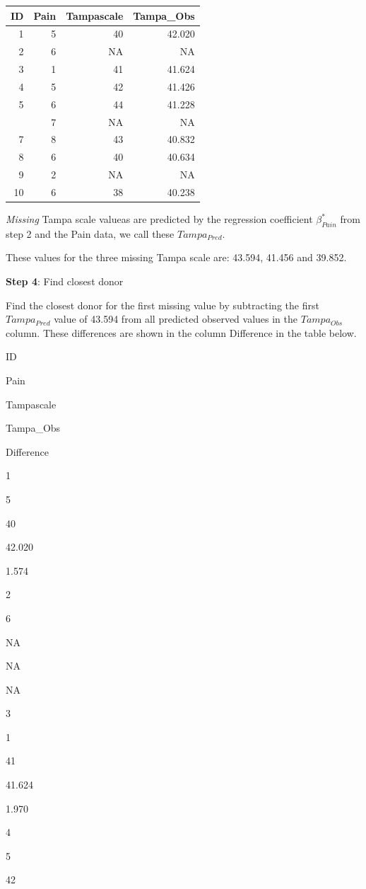 \documentclass[
]{book}
\begin{document}
\begin{tabular}{rrrr}
\toprule
ID & Pain & Tampascale & Tampa\_Obs\\
\midrule
1 & 5 & 40 & 42.020\\
2 & 6 & NA & NA\\
3 & 1 & 41 & 41.624\\
4 & 5 & 42 & 41.426\\
5 & 6 & 44 & 41.228\\
\addlinespace
6 & 7 & NA & NA\\
7 & 8 & 43 & 40.832\\
8 & 6 & 40 & 40.634\\
9 & 2 & NA & NA\\
10 & 6 & 38 & 40.238\\
\bottomrule
\end{tabular}

\emph{Missing} Tampa scale valueas are predicted by the regression
coefficient \(\beta_{Pain}^*\) from step 2 and the Pain data, we call
these \(Tampa_{Pred}\).

These values for the three missing Tampa scale are: 43.594, 41.456 and
39.852.

\textbf{Step 4}: Find closest donor

Find the closest donor for the first missing value by subtracting the
first \(Tampa_{Pred}\) value of 43.594 from all predicted observed
values in the \(Tampa_{Obs}\) column. These differences are shown in the
column Difference in the table below.

ID

Pain

Tampascale

Tampa\_Obs

Difference

1

5

40

42.020

1.574

2

6

NA

NA

NA

3

1

41

41.624

1.970

4

5

42
\end{document}
